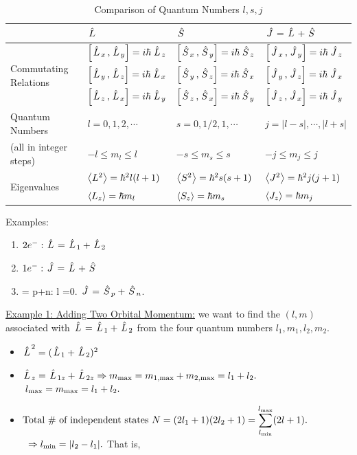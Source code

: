 \documentclass{school-22.101-notes}
\begin{document}
\begin{table}[h!]
\begin{tabular}{|p{1.5in}|p{1.5in}|p{1.5in}|p{1.5in}|} \hline
 & $\left. \hat{L} \right.$ & $\left. \hat{S} \right.$ &$\left. \hat{J} \right. = \left. \hat{L} \right. + \left. \hat{S} \right.$ \\ \hline
\multirow{3}{*}{Commutating Relations} &
   $\left[ \left. \hat{L} \right._x, \left. \hat{L} \right._y \right] = i \hbar \left. \hat{L} \right._z$ &  $\left[ \left. \hat{S} \right._x, \left. \hat{S} \right._y \right] = i \hbar \left. \hat{S} \right._z$ &  $\left[ \left. \hat{J} \right._x, \left. \hat{J} \right._y \right] = i \hbar \left. \hat{J} \right._z$ \\
&  $\left[ \left. \hat{L} \right._y, \left. \hat{L} \right._z \right] = i \hbar \left. \hat{L} \right._x$ &  $\left[ \left. \hat{S} \right._y, \left. \hat{S} \right._z \right] = i \hbar \left. \hat{S} \right._x$ &  $\left[ \left. \hat{J} \right._y, \left. \hat{J} \right._z \right] = i \hbar \left. \hat{J} \right._x$ \\
&  $\left[ \left. \hat{L} \right._z, \left. \hat{L} \right._x \right] = i \hbar \left. \hat{L} \right._y$ &  $\left[ \left. \hat{S} \right._z, \left. \hat{S} \right._x \right] = i \hbar \left. \hat{S} \right._y$ &  $\left[ \left. \hat{J} \right._z, \left. \hat{J} \right._x \right] = i \hbar \left. \hat{J} \right._y$ \\ \hline
Quantum Numbers & $ l = 0,1,2,\cdots $ & $s = 0, 1/2, 1, \cdots$               & $ j =|l-s|,\cdots, |l+s|$ \\
(all in integer steps) & $-l \le m_l \le l  $  & $ -s \le m_s \le s$  & $-j \le m_j \le j$  \\ \hline
\multirow{2}{*}{Eigenvalues} 
& $\left< L^2 \right> = \hbar^2 l (l+1)$ 
& $\left< S^2 \right> = \hbar^2 s (s+1)$
& $\left< J^2 \right> = \hbar^2 j(j+1)$\\ 
& $\left< L_z \right> = \hbar m_l$ 
& $\left< S_z \right> = \hbar m_s$ 
& $\left< J_z \right> =  \hbar m_j$  \\ \hline
\end{tabular}
\caption{Comparison of Quantum Numbers $l,s,j$}
\label{quantum-numbers}
\end{table}


Examples:
\begin{enumerate}
\item $2e^-: \left. \hat{L} \right. = \left. \hat{L} \right._1 + \left. \hat{L} \right._2 $ 
\item $ 1 e^-: \left. \hat{J} \right. = \left. \hat{L} \right. + \left. \hat{S} \right.$
\item {} = p+n: l =0. $\left. \hat{J} \right. = \left. \hat{S} \right._p + \left. \hat{S} \right._n$. 
\end{enumerate}

\uline{Example 1: Adding Two Orbital Momentum:} we want to find the $(l,m)$ associated with $\left. \hat{L} \right.= \left. \hat{L} \right._1 + \left. \hat{L} \right._2$ from the four quantum numbers $l_1, m_1, l_2, m_2$. 
\begin{itemize}
\item $\left. \hat{L} \right.^2 = (\left. \hat{L} \right._1 + \left. \hat{L} \right._2)^2 $
\item $ \left. \hat{L} \right._z = \left. \hat{L} \right._{1z} + \left. \hat{L} \right._{2z} \Rightarrow m_{\mathrm{max}} = m_{\mathrm{1,max}} + m_{\mathrm{2,max}} = l_1 + l_2.$
$\mbox{ } l_{\mathrm{max}} = m_{\mathrm{max}} = l_1 + l_2.$
\item $ \mbox{Total \# of independent states } N = (2 l_1 + 1) (2l_2 + 1) = \displaystyle\sum_{l_{\mathrm{min}}}^{l_{\mathrm{max}}} (2l+1).$
$\mbox{ }\Rightarrow l_{\mathrm{min}} = |l_2 - l_1 |.$ That is,
\end{itemize}
\end{document}

